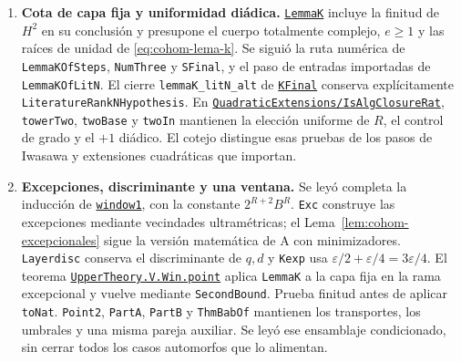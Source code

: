 \begin{enumerate}
\item \textbf{Cota de capa fija y uniformidad diádica.}
\href{https://github.com/CocoSgt/riemann-hypothesis-lean/blob/7cbf7a0c32fca1badf05931879a37c3f8a2b03b4/src/Development/AutomorphicArithmetic/AutomorphicVarieties/GeneratorCountTuples/LemmaK.lean}{\texttt{LemmaK}}
incluye la finitud de $H^2$ en su conclusión y presupone
el cuerpo totalmente complejo, $e\ge1$ y las raíces de
unidad de \eqref{eq:cohom-lema-k}.
Se siguió la ruta numérica de
\texttt{LemmaKOfSteps}, \texttt{NumThree} y
\texttt{SFinal}, y el paso de entradas importadas de
\texttt{LemmaKOfLitN}.
El cierre \texttt{lemmaK\_litN\_alt} de
\href{https://github.com/CocoSgt/riemann-hypothesis-lean/blob/7cbf7a0c32fca1badf05931879a37c3f8a2b03b4/src/Development/AutomorphicArithmetic/AutomorphicVarieties/ModularityArgument/ThresholdArguments/DenseThresholdCases/KFinal.lean}{\texttt{KFinal}}
conserva explícitamente
\texttt{LiteratureRankNHypothesis}.
En
\href{https://github.com/CocoSgt/riemann-hypothesis-lean/blob/7cbf7a0c32fca1badf05931879a37c3f8a2b03b4/src/Development/AutomorphicArithmetic/AutomorphicVarieties/QuadraticExtensions/IsAlgClosureRat.lean}{\texttt{QuadraticExtensions/IsAlgClosureRat}},
\texttt{towerTwo}, \texttt{twoBase} y \texttt{twoIn}
mantienen la elección uniforme de $R$, el control
de grado y el $+1$ diádico.
El cotejo distingue esas pruebas de los pasos de
Iwasawa y extensiones cuadráticas que importan.

\item \textbf{Excepciones, discriminante y una ventana.}
Se leyó completa la inducción de
\href{https://github.com/CocoSgt/riemann-hypothesis-lean/blob/7cbf7a0c32fca1badf05931879a37c3f8a2b03b4/src/Development/AutomorphicArithmetic/AutomorphicVarieties/LayeredIsomorphisms/Window1.lean}{\texttt{window1}},
con la constante $2^{R+2}B^R$.
\texttt{Exc} construye las excepciones mediante
vecindades ultramétricas; el
Lema~\ref{lem:cohom-excepcionales} sigue la versión
matemática de A con minimizadores.
\texttt{Layerdisc} conserva el discriminante de
$q,d$ y \texttt{Kexp} usa
$\varepsilon/2+\varepsilon/4=3\varepsilon/4$.
El teorema
\href{https://github.com/CocoSgt/riemann-hypothesis-lean/blob/7cbf7a0c32fca1badf05931879a37c3f8a2b03b4/src/Development/AutomorphicArithmetic/AutomorphicVarieties/LayeredIsomorphisms/ImportsAlt.lean}{\texttt{UpperTheory.V.Win.point}}
aplica \texttt{LemmaK} a la capa fija en la rama
excepcional y vuelve mediante \texttt{SecondBound}.
Prueba finitud antes de aplicar \texttt{toNat}.
\texttt{Point2}, \texttt{PartA}, \texttt{PartB} y
\texttt{ThmBabOf} mantienen los transportes, los
umbrales y una misma pareja auxiliar.
Se leyó ese ensamblaje condicionado, sin cerrar
todos los casos automorfos que lo alimentan.


\end{enumerate}
